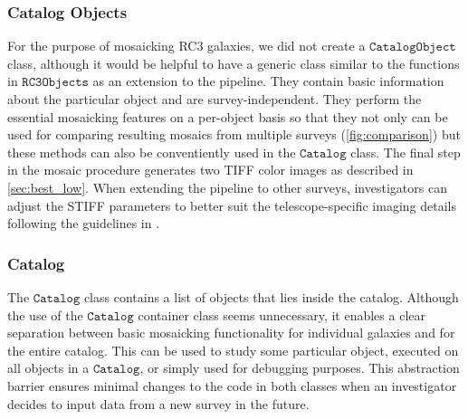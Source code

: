 \documentclass[5p]{elsarticle}
\begin{document}
	\subsubsection{Catalog Objects}
	For the purpose of mosaicking RC3 galaxies, we did not create a $\texttt{CatalogObject}$ class, although it would be helpful to have a generic class similar to the functions in $\texttt{RC3Objects}$ as an extension to the pipeline. They contain basic information about the particular object and are survey-independent. They perform the essential mosaicking features on a per-object basis so that they not only can be used for comparing resulting mosaics from multiple surveys (\autoref{fig:comparison}) but these methods can also be conventiently used in the $\texttt{Catalog}$ class. The final step in the mosaic procedure generates two TIFF color images as described in \autoref{sec:best_low}.  When extending the pipeline to other surveys, investigators can adjust the STIFF parameters to better suit the telescope-specific imaging details following the guidelines in \citealp{stiff}.
    \subsubsection{Catalog}
	The $\texttt{Catalog}$ class contains a list of objects that lies inside the catalog. Although the use of the $\texttt{Catalog}$ container class seems unnecessary, it enables a clear separation between basic mosaicking functionality for individual galaxies and for the entire catalog. This can be used to study some particular object, executed on all objects in a $\texttt{Catalog}$, or simply used for debugging purposes. This abstraction barrier ensures minimal changes to the code in both classes when an investigator decides to input data from a new survey in the future.
\end{document}
